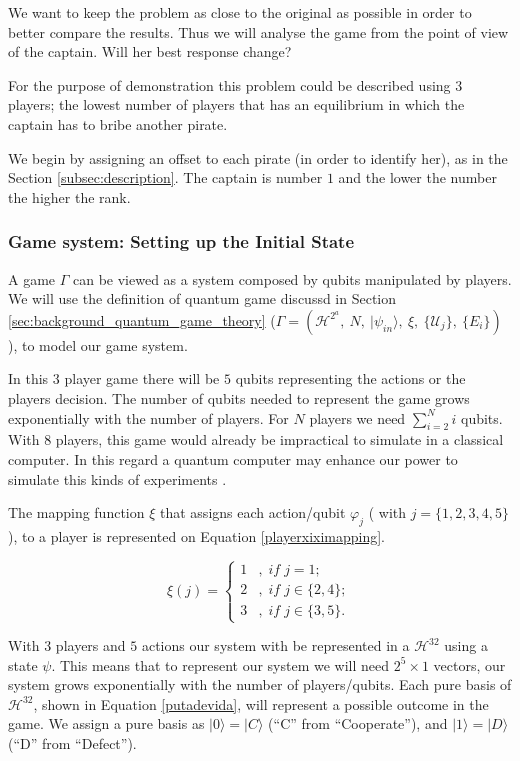 We want to keep the problem as close to the original as possible in order to better compare the results. Thus we will analyse the game from the point of view of the captain. Will her best response change?

For the purpose of demonstration this problem could be described using $3$ players; the lowest number of players that has an equilibrium in which the captain has to bribe another pirate. 

We begin by assigning an offset to each pirate (in order to identify her), as in the Section \ref{subsec:description}. The captain is number $1$ and the lower the number the higher the rank. 



\subsubsection{Game system: Setting up the Initial State}
\label{subsec:pirates_initialstate}

A game $\Gamma$ can be viewed as a system composed by qubits manipulated by players. We will use the definition of quantum game discussd in Section \ref{sec:background_quantum_game_theory} ($\Gamma=(\mathcal{H}^{2^{a}},\: N,\:\vert\psi_{in}\rangle,\:\xi,\:\{\mathcal{U}_{j}\},\:\{E_{i}\})\label{eq:quantum_game_six_tuple}
$), to model our game system. 


In this $3$ player game there will be $5$ qubits representing the actions or the players decision. 
The number of qubits needed to represent the game grows exponentially with the number of players. For $N$ players we need $\sum_{i=2}^{N}{i}$ qubits. With 8 players, this game would already be impractical to simulate in a classical computer. In this regard a quantum computer may enhance our power to simulate this kinds of experiments \cite{Rieffel2011}.

The mapping function $\xi$ that assigns each action/qubit $\varphi_{j}$ ( with $j=\{ 1, 2, 3, 4, 5\}$), to a player is represented on Equation \ref{playerxiximapping}. 

\begin{equation}
\xi(j)=\begin{cases}
1 & ,\; if\; j=1;\\
2 & ,\; if\; j\in\{2,4\};\\
3 & ,\; if\; j\in\{3,5\}.
\end{cases}
\label{playerxiximapping}
\end{equation}


With $3$ players and $5$ actions our system with be represented in a $\mathcal{H}^{32}$ using a state $\psi$. This means that to represent our system we will need $2^{5}\times 1$ vectors, our system grows exponentially with the number of players/qubits. Each pure basis  of $\mathcal{H}^{32}$, shown in Equation \ref{putadevida}, will represent a possible outcome in the game. We assign a pure basis as $\vert 0\rangle = \vert C\rangle$ (``C'' from ``Cooperate''), and $\vert 1\rangle = \vert D\rangle$ (``D'' from ``Defect'').


